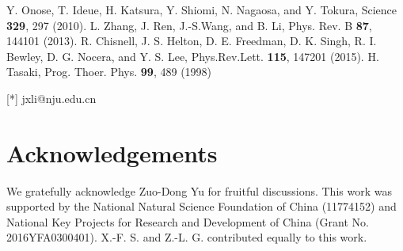 \documentclass[a0,portrait]{a0poster}
\begin{document}
\begin{multicols}{2}
\nocite{*} %

\begin{thebibliography}{99}

Y. Onose, T. Ideue, H. Katsura, Y. Shiomi, N. Nagaosa, and Y. Tokura, Science \textbf{329}, 297 (2010).
L. Zhang, J. Ren, J.-S.Wang, and B. Li, Phys. Rev. B \textbf{87}, 144101 (2013).
R. Chisnell, J. S. Helton, D. E. Freedman, D. K. Singh, R. I. Bewley, D. G. Nocera, and Y. S. Lee, Phys.Rev.Lett. \textbf{115}, 147201 (2015).
H. Tasaki, Prog. Thoer. Phys. \textbf{99}, 489 (1998)

\end{thebibliography}

[*] jxli@nju.edu.cn


\section*{Acknowledgements}
\par We gratefully acknowledge Zuo-Dong Yu for fruitful discussions. This work was supported by the National Natural Science Foundation of China (11774152) and National Key Projects for Research and Development of China (Grant No. 2016YFA0300401). X.-F. S. and Z.-L. G. contributed equally to this work.


\end{multicols}
\end{document}
